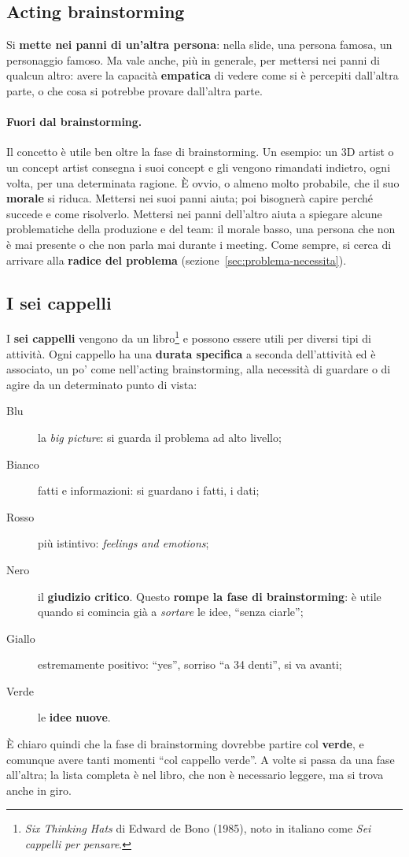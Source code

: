 \subsection{Acting brainstorming}

Si \textbf{mette nei panni di un'altra persona}: nella slide, una persona
famosa, un personaggio famoso. Ma vale anche, più in generale, per mettersi
nei panni di qualcun altro: avere la capacità \textbf{empatica} di vedere come
si è percepiti dall'altra parte, o che cosa si potrebbe provare dall'altra
parte.

\paragraph{Fuori dal brainstorming.} Il concetto è utile ben oltre la fase di
brainstorming. Un esempio: un 3D artist o un concept artist consegna i suoi
concept e gli vengono rimandati indietro, ogni volta, per una determinata
ragione. È ovvio, o almeno molto probabile, che il suo \textbf{morale} si
riduca. Mettersi nei suoi panni aiuta; poi bisognerà capire perché succede e
come risolverlo. Mettersi nei panni dell'altro aiuta a spiegare alcune
problematiche della produzione e del team: il morale basso, una persona che
non è mai presente o che non parla mai durante i meeting. Come sempre, si
cerca di arrivare alla \textbf{radice del problema}
(sezione~\ref{sec:problema-necessita}).

\subsection{I sei cappelli}

I \textbf{sei cappelli} vengono da un libro\footnote{\emph{Six Thinking Hats}
di Edward de Bono (1985), noto in italiano come \emph{Sei cappelli per
pensare}.} e possono essere utili per diversi tipi di attività. Ogni cappello
ha una \textbf{durata specifica} a seconda dell'attività ed è associato, un
po' come nell'acting brainstorming, alla necessità di guardare o di agire da
un determinato punto di vista:
\begin{description}
  \item[Blu] la \emph{big picture}: si guarda il problema ad alto livello;
  \item[Bianco] fatti e informazioni: si guardano i fatti, i dati;
  \item[Rosso] più istintivo: \emph{feelings and emotions};
  \item[Nero] il \textbf{giudizio critico}. Questo \textbf{rompe la fase di
        brainstorming}: è utile quando si comincia già a \emph{sortare} le
        idee, ``senza ciarle'';
  \item[Giallo] estremamente positivo: ``yes'', sorriso ``a 34 denti'', si va
        avanti;
  \item[Verde] le \textbf{idee nuove}.
\end{description}
È chiaro quindi che la fase di brainstorming dovrebbe partire col
\textbf{verde}, e comunque avere tanti momenti ``col cappello verde''. A volte
si passa da una fase all'altra; la lista completa è nel libro, che non è
necessario leggere, ma si trova anche in giro.

